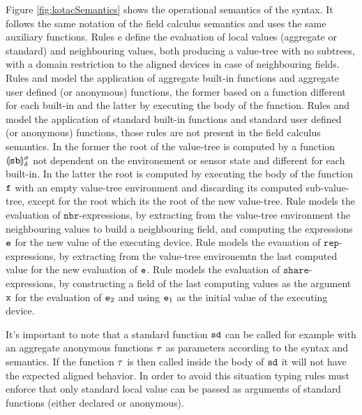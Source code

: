 Figure \ref{fig:kotacSemantics} shows the operational semantics of the syntax. It follows the same notation of the field calculus semantics and uses the same auxiliary functions. Rules  e  define the evaluation of local values (aggregate or standard) and neighbouring values, both producing a value-tree with no subtrees, with a domain restriction to the aligned devices in case of neighbouring fields. Rules  and  model the application of aggregate built-in functions and aggregate user defined (or anonymous) functions, the former based on a function different for each built-in and the latter by executing the body of the function. Rules  and  model the application of standard built-in functions and standard user defined (or anonymous) functions, those rules are not present in the field calculus semantics. In the former the root of the value-tree is computed by a function $\llparenthesis \mathtt{sb} \rrparenthesis_{ \delta{}}^{\sigma}$ not dependent on the environement or sensor state and different for each built-in. In the latter the root is computed by executing the body of the function $\mathtt{f}$ with an empty value-tree environment and discarding its computed sub-value-tree, except for the root which its the root of the new value-tree. Rule  models the evaluation of $\mathtt{nbr}$-expressions, by extracting from the value-tree environment the neighbouring values to build a neighbouring field, and computing the expressions $\mathtt{e}$ for the new value of the executing device. Rule  models the evauation of $\mathtt{rep}$-expressions, by extracting from the value-tree environemtn the last computed value for the new evaluation of $\mathtt{e}$. Rule  models the evaluation of $\mathtt{share}$-expressions, by constructing a field of the last computing values as the argument $\mathtt{x}$ for the evaluation of $\mathtt{e}_2$ and using $\mathtt{e}_1$ as the initial value of the executing device.

It's important to note that a standard function $\mathtt{sd}$ can be called for example with an aggregate anonymous functions $\tau$ as parameters according to the syntax and semantics. If the function $\tau$ is then called inside the body of $\mathtt{sd}$ it will not have the expected aligned behavior. In order to avoid this situation typing rules must enforce that only standard local value can be passed as arguments of standard functions (either declared or anonymous).


